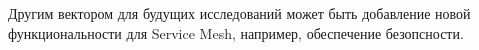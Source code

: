 Другим вектором для будущих исследований может быть добавление новой функциональности для Service Mesh, например, обеспечение безопсности.
%
%
%
%
%

